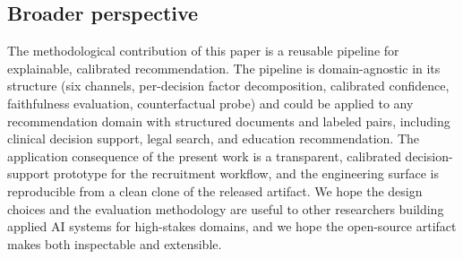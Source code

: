 \subsection{Broader perspective}
The methodological contribution of this paper is a reusable pipeline for explainable, calibrated recommendation.
The pipeline is domain-agnostic in its structure (six channels, per-decision factor decomposition, calibrated confidence, faithfulness evaluation, counterfactual probe) and could be applied to any recommendation domain with structured documents and labeled pairs, including clinical decision support, legal search, and education recommendation.
The application consequence of the present work is a transparent, calibrated decision-support prototype for the recruitment workflow, and the engineering surface is reproducible from a clean clone of the released artifact.
We hope the design choices and the evaluation methodology are useful to other researchers building applied AI systems for high-stakes domains, and we hope the open-source artifact makes both inspectable and extensible.
